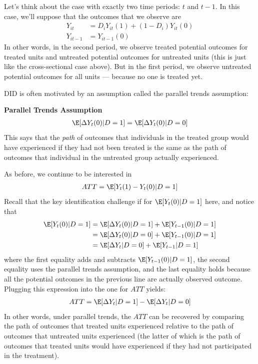 \documentclass[
  letterpaper,
  DIV=11,
  numbers=noendperiod]{scrreprt}
\begin{document}
Let's think about the case with exactly two time periods: \(t\) and
\(t-1\). In this case, we'll suppose that the outcomes that we observe
are \begin{align*}
  Y_{it} &= D_i Y_{it}(1) + (1-D_i) Y_{it}(0) \\
  Y_{it-1} &= Y_{it-1}(0)
\end{align*} In other words, in the second period, we observe treated
potential outcomes for treated units and untreated potential outcomes
for untreated units (this is just like the cross-sectional case above).
But in the first period, we observe untreated potential outcomes for all
units --- because no one is treated yet.

DID is often motivated by an assumption called the parallel trends
assumption:

\textbf{Parallel Trends Assumption} \begin{align*}
\E[\Delta Y_t(0) | D=1] = \E[\Delta Y_t(0) | D=0]
\end{align*} This says that the \emph{path} of outcomes that individuals
in the treated group would have experienced if they had not been treated
is the same as the path of outcomes that individual in the untreated
group actually experienced.

As before, we continue to be interested in \begin{align*}
  ATT = \E[Y_t(1) - Y_t(0) | D=1]
\end{align*} Recall that the key identification challenge if for
\(\E[Y_t(0)|D=1]\) here, and notice that \begin{align*}
  \E[Y_t(0) | D=1] &= \E[\Delta Y_t(0) | D=1] + \E[Y_{t-1}(0) | D=1] \\
  &= \E[\Delta Y_t(0) | D=0] + \E[Y_{t-1}(0)|D=1] \\
  &= \E[\Delta Y_t | D=0] + \E[Y_{t-1}|D=1]
\end{align*} where the first equality adds and subtracts
\(\E[Y_{t-1}(0)|D=1]\), the second equality uses the parallel trends
assumption, and the last equality holds because all the potential
outcomes in the previous line are actually observed outcome. Plugging
this expression into the one for \(ATT\) yields: \begin{align*}
  ATT = \E[\Delta Y_t | D=1] - \E[\Delta Y_t | D=0]
\end{align*} In other words, under parallel trends, the \(ATT\) can be
recovered by comparing the path of outcomes that treated units
experienced relative to the path of outcomes that untreated units
experienced (the latter of which is the path of outcomes that treated
units would have experienced if they had not participated in the
treatment).
\end{document}
